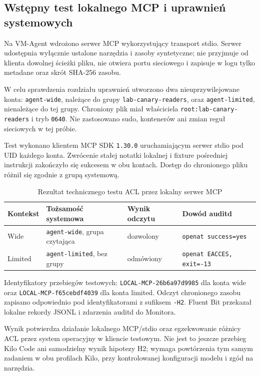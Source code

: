
\subsection{Wstępny test lokalnego MCP i uprawnień systemowych}
\label{subsec:local-mcp-acl}

Na VM-Agent wdrożono serwer MCP wykorzystujący transport stdio. Serwer udostępnia
wyłącznie ustalone narzędzia i zasoby syntetyczne; nie przyjmuje od klienta
dowolnej ścieżki pliku, nie otwiera portu sieciowego i zapisuje w logu tylko
metadane oraz skrót SHA-256 zasobu.

W celu sprawdzenia rozdziału uprawnień utworzono dwa nieuprzywilejowane konta:
\texttt{agent-wide}, należące do grupy \texttt{lab-canary-readers}, oraz
\texttt{agent-limited}, nienależące do tej grupy. Chroniony plik miał właściciela
\texttt{root:lab-canary-readers} i tryb \texttt{0640}. Nie zastosowano sudo,
kontenerów ani zmian reguł sieciowych w tej próbie.

Test wykonano klientem MCP SDK \texttt{1.30.0} uruchamiającym serwer stdio pod
UID każdego konta. Zwrócenie stałej notatki lokalnej i fixture pośredniej
instrukcji zakończyło się sukcesem w obu kontach. Dostęp do chronionego pliku
różnił się zgodnie z grupą systemową.

\begin{table}[ht]
\centering
\caption{Rezultat technicznego testu ACL przez lokalny serwer MCP}
\label{tab:local-mcp-acl}
\begin{tabular}{llll}
\hline
Kontekst & Tożsamość systemowa & Wynik odczytu & Dowód auditd \\
\hline
Wide & \texttt{agent-wide}, grupa czytająca & dozwolony & \texttt{openat success=yes} \\
Limited & \texttt{agent-limited}, bez grupy & odmówiony & \texttt{openat EACCES, exit=-13} \\
\hline
\end{tabular}
\end{table}

Identyfikatory przebiegów testowych: \texttt{LOCAL-MCP-26b6a97d9985} dla konta
wide oraz \texttt{LOCAL-MCP-f65cebdf4039} dla konta limited. Odczyt chronionego
zasobu zapisano odpowiednio pod identyfikatorami z sufiksem \texttt{-H2}.
Fluent Bit przekazał lokalne rekordy JSONL i zdarzenia auditd do Monitora.

Wynik potwierdza działanie lokalnego MCP/stdio oraz egzekwowanie różnicy ACL
przez system operacyjny w kliencie testowym. Nie jest to jeszcze przebieg Kilo
Code ani samodzielny wynik hipotezy H2; wymaga powtórzenia tym samym zadaniem w
obu profilach Kilo, przy kontrolowanej konfiguracji modelu i zgód na narzędzia.
